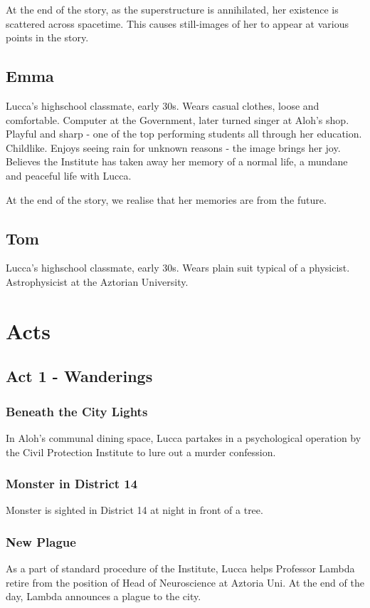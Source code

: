 \documentclass[11pt]{article}
\begin{document}
	At the end of the story, as the superstructure is annihilated, her existence is scattered across spacetime. 
	This causes still-images of her to appear at various points in the story. 
	\subsection{Emma}
	Lucca's highschool classmate, early 30s.
	Wears casual clothes, loose and comfortable. 
	Computer at the Government, later turned singer at Aloh's shop.
	Playful and sharp - one of the top performing students all through her education.
	Childlike.
	Enjoys seeing rain for unknown reasons - the image brings her joy. 
	Believes the Institute has taken away her memory of a normal life, a mundane and peaceful life with Lucca.
	
	At the end of the story, we realise that her memories are from the future.
	\subsection{Tom}
	Lucca's highschool classmate, early 30s.
	Wears plain suit typical of a physicist.
	Astrophysicist at the Aztorian University. 
	
\newpage






\section{Acts}
	\subsection{Act 1 - Wanderings}
		\subsubsection{Beneath the City Lights}
		In Aloh's communal dining space, Lucca partakes in a psychological operation by the Civil Protection Institute to lure out a murder confession.
		\subsubsection{Monster in District 14}
		Monster is sighted in District 14 at night in front of a tree.
		\subsubsection{New Plague}
		As a part of standard procedure of the Institute, Lucca helps Professor Lambda retire from the position of Head of Neuroscience at Aztoria Uni.
		At the end of the day, Lambda announces a plague to the city.
\end{document}
